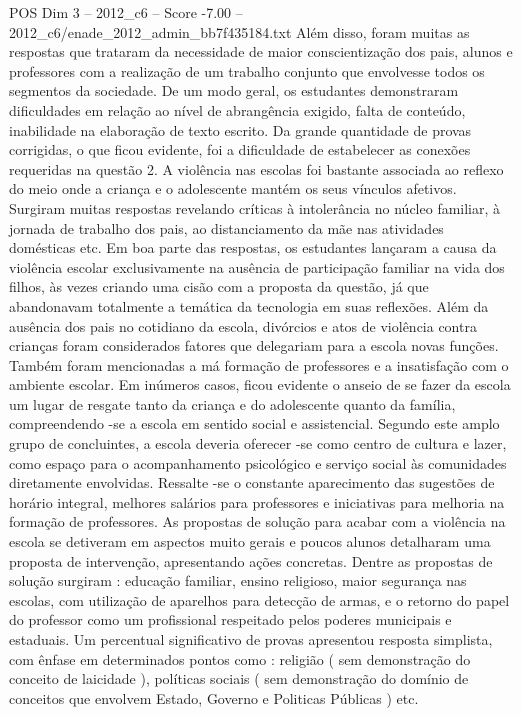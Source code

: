 \begin{textsample}{POS Dim 3 – 2012\_c6 – Score -7.00 – 2012\_c6/enade\_2012\_admin\_bb7f435184.txt}
Além disso, foram muitas as respostas que trataram da necessidade de maior conscientização dos pais, alunos e professores com a realização de um trabalho conjunto que envolvesse todos os segmentos da sociedade.
De um modo geral, os estudantes demonstraram dificuldades em relação ao nível de abrangência exigido, falta de conteúdo, inabilidade na elaboração de texto escrito.
Da grande quantidade de provas corrigidas, o que ficou evidente, foi a dificuldade de estabelecer as conexões requeridas na questão 2.
A violência nas escolas foi bastante associada ao reflexo do meio onde a criança e o adolescente mantém os seus vínculos afetivos.
Surgiram muitas respostas revelando críticas à intolerância no núcleo familiar, à jornada de trabalho dos pais, ao distanciamento da mãe nas atividades domésticas etc.
Em boa parte das respostas, os estudantes lançaram a causa da violência escolar exclusivamente na ausência de participação familiar na vida dos filhos, às vezes criando uma cisão com a proposta da questão, já que abandonavam totalmente a temática da tecnologia em suas reflexões.
Além da ausência dos pais no cotidiano da escola, divórcios e atos de violência contra crianças foram considerados fatores que delegariam para a escola novas funções.
Também foram mencionadas a má formação de professores e a insatisfação com o ambiente escolar.
Em inúmeros casos, ficou evidente o anseio de se fazer da escola um lugar de resgate tanto da criança e do adolescente quanto da família, compreendendo -se a escola em sentido social e assistencial.
Segundo este amplo grupo de concluintes, a escola deveria oferecer -se como centro de cultura e lazer, como espaço para o acompanhamento psicológico e serviço social às comunidades diretamente envolvidas.
Ressalte -se o constante aparecimento das sugestões de horário integral, melhores salários para professores e iniciativas para melhoria na formação de professores.
As propostas de solução para acabar com a violência na escola se detiveram em aspectos muito gerais e poucos alunos detalharam uma proposta de intervenção, apresentando ações concretas.
Dentre as propostas de solução surgiram : educação familiar, ensino religioso, maior segurança nas escolas, com utilização de aparelhos para detecção de armas, e o retorno do papel do professor como um profissional respeitado pelos poderes municipais e estaduais.
Um percentual significativo de provas apresentou resposta simplista, com ênfase em determinados pontos como : religião ( sem demonstração do conceito de laicidade ), políticas sociais ( sem demonstração do domínio de conceitos que envolvem Estado, Governo e Politicas Públicas ) etc.

\end{textsample}
